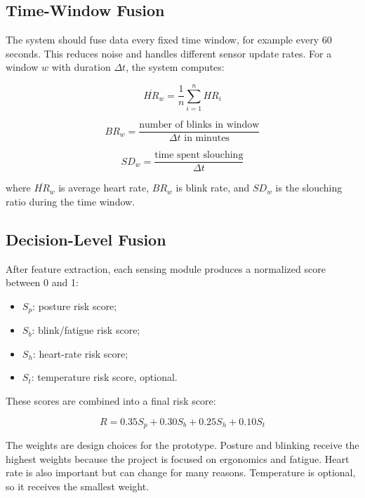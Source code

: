 \documentclass[11pt,a4paper]{article}
\begin{document}
\subsection{Time-Window Fusion}
The system should fuse data every fixed time window, for example every 60 seconds. This reduces noise and handles different sensor update rates. For a window $w$ with duration $\Delta t$, the system computes:

\begin{equation}
\overline{HR}_w = \frac{1}{n}\sum_{i=1}^{n} HR_i
\end{equation}

\begin{equation}
BR_w = \frac{\text{number of blinks in window}}{\Delta t \text{ in minutes}}
\end{equation}

\begin{equation}
SD_w = \frac{\text{time spent slouching}}{\Delta t}
\end{equation}

where $\overline{HR}_w$ is average heart rate, $BR_w$ is blink rate, and $SD_w$ is the slouching ratio during the time window.

\subsection{Decision-Level Fusion}
After feature extraction, each sensing module produces a normalized score between 0 and 1:

\begin{itemize}[leftmargin=*]
    \item $S_p$: posture risk score;
    \item $S_b$: blink/fatigue risk score;
    \item $S_h$: heart-rate risk score;
    \item $S_t$: temperature risk score, optional.
\end{itemize}

These scores are combined into a final risk score:

\begin{equation}
R = 0.35S_p + 0.30S_b + 0.25S_h + 0.10S_t
\end{equation}

The weights are design choices for the prototype. Posture and blinking receive the highest weights because the project is focused on ergonomics and fatigue. Heart rate is also important but can change for many reasons. Temperature is optional, so it receives the smallest weight.
\end{document}
